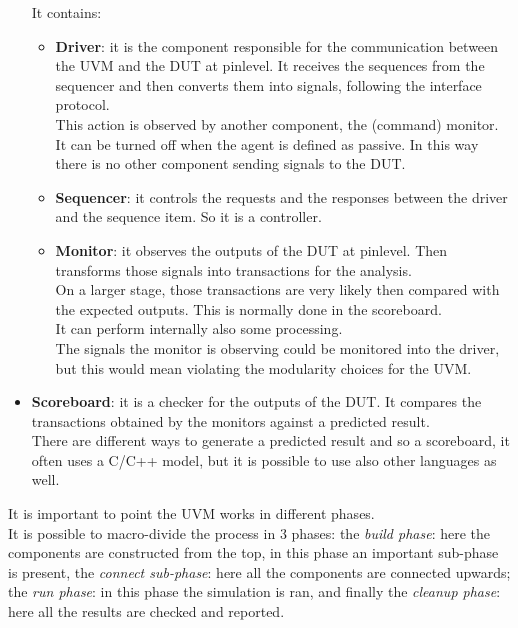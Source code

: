 \begin{itemize}
    It contains:
    \begin{itemize}
        \item \textbf{Driver}: it is the component responsible for the communication between the UVM and the DUT at pinlevel. It receives the sequences from the sequencer and then converts them into signals, following the interface protocol.\\
        This action is observed by another component, the (command) monitor.\\
        
        It can be turned off when the agent is defined as passive. In this way there is no other component sending signals to the DUT.

        
         \item \textbf{Sequencer}: it controls the requests and the responses between the driver and the sequence item. So it is a controller.
         
        \item \textbf{Monitor}: it observes the outputs of the DUT at pinlevel. Then transforms those signals into transactions for the analysis.\\
        On a larger stage, those transactions are very likely then compared with the expected outputs. This is normally done in the scoreboard.\\
        It can perform internally also some processing.\\
        The signals the monitor is observing could be monitored into the driver, but this would mean violating the modularity choices for the UVM.

        
    \end{itemize}
    
    \item \textbf{Scoreboard}: it is a checker for the outputs of the DUT. It compares the transactions obtained by the monitors against a predicted result.\\
    There are different ways to generate a predicted result and so a scoreboard, it often uses a C/C++ model, but it is possible to use also other languages as well.
    
\end{itemize}


It is important to point the UVM works in different phases.\\
It is possible to macro-divide the process in 3 phases: the \textit{build phase}: here the components are constructed from the top, in this phase an important sub-phase is present, the \textit{connect sub-phase}: here all the components are connected upwards; the \textit{run phase}: in this phase the simulation is ran, and finally the \textit{cleanup phase}: here all the results are checked and reported.

